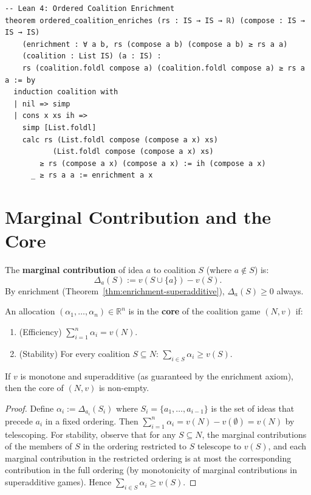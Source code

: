 \begin{lstlisting}
-- Lean 4: Ordered Coalition Enrichment
theorem ordered_coalition_enriches (rs : IS → IS → ℝ) (compose : IS → IS → IS)
    (enrichment : ∀ a b, rs (compose a b) (compose a b) ≥ rs a a)
    (coalition : List IS) (a : IS) :
    rs (coalition.foldl compose a) (coalition.foldl compose a) ≥ rs a a := by
  induction coalition with
  | nil => simp
  | cons x xs ih =>
    simp [List.foldl]
    calc rs (List.foldl compose (compose a x) xs)
           (List.foldl compose (compose a x) xs)
        ≥ rs (compose a x) (compose a x) := ih (compose a x)
      _ ≥ rs a a := enrichment a x
\end{lstlisting}

\section{Marginal Contribution and the Core}

\begin{definition}
\label{def:marginal-contribution}
The \textbf{marginal contribution} of idea $a$ to coalition $S$ (where
$a \notin S$) is:
\[
  \Delta_a(S) := v(S \cup \{a\}) - v(S).
\]
By enrichment (Theorem~\ref{thm:enrichment-superadditive}), $\Delta_a(S) \geq 0$
always.
\end{definition}

\begin{definition}
\label{def:core}
An allocation $(\alpha_1, \ldots, \alpha_n) \in \mathbb{R}^n$ is in the
\textbf{core} of the coalition game $(N, v)$ if:
\begin{enumerate}
\item (Efficiency) $\sum_{i=1}^n \alpha_i = v(N)$.
\item (Stability) For every coalition $S \subseteq N$:
  $\sum_{i \in S} \alpha_i \geq v(S)$.
\end{enumerate}
\end{definition}

\begin{theorem}
\label{thm:core-nonempty}
If $v$ is monotone and superadditive (as guaranteed by the enrichment axiom),
then the core of $(N, v)$ is non-empty.
\end{theorem}

\begin{proof}
Define $\alpha_i := \Delta_{a_i}(S_i)$ where $S_i = \{a_1, \ldots, a_{i-1}\}$
is the set of ideas that precede $a_i$ in a fixed ordering.  Then
$\sum_{i=1}^n \alpha_i = v(N) - v(\emptyset) = v(N)$ by telescoping.  For
stability, observe that for any $S \subseteq N$, the marginal contributions of
the members of $S$ in the ordering restricted to $S$ telescope to $v(S)$, and
each marginal contribution in the restricted ordering is at most the
corresponding contribution in the full ordering (by monotonicity of marginal
contributions in superadditive games).  Hence
$\sum_{i \in S} \alpha_i \geq v(S)$.
\end{proof}

